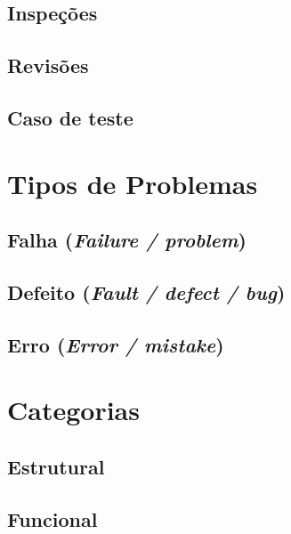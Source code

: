 \documentclass[
	12pt,				%
	openright,			%
	twoside,			%
	a4paper,			%
	english,			%
	brazil,				%
	]{abntex2}
\begin{document}
\subsection{Inspeções}


\subsection{Revisões}


\subsection{Caso de teste}

\section{Tipos de Problemas}


\subsection{Falha (\emph{Failure / problem})}


\subsection{Defeito (\emph{Fault / defect / bug})}


\subsection{Erro (\emph{Error / mistake})}

\section{Categorias}


\subsection{Estrutural}


\subsection{Funcional}

\end{document}
